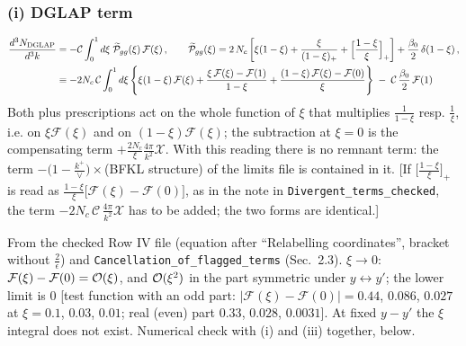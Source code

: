 \documentclass[9pt]{article}
\numberwithin{equation}{section}
\begin{document}
\subsubsection{(i) DGLAP term}
\begin{align}
\frac{d^{3}N_{\rm DGLAP}}{d^{3}k} & =-\mathcal{C}\int_{0}^{1}d\xi\;\widetilde{\mathcal P}_{gg}(\xi)\,\mathcal{F}(\xi)\,,\qquad
\widetilde{\mathcal{P}}_{gg}(\xi) = 2\,N_{c}\left[\xi(1-\xi) + \frac{\xi}{(1-\xi)_{+}} + \Big[\frac{1-\xi}{\xi}\Big]_{+}\right]+\frac{\beta_{0}}{2}\,\delta(1-\xi)\,,\notag\\
& \equiv-2N_{c}\,\mathcal{C}\int_{0}^{1}d\xi\,\Bigg\{\xi(1-\xi)\,\mathcal{F}(\xi)+\frac{\xi\,\mathcal{F}(\xi)-\mathcal{F}(1)}{1-\xi}+\frac{(1-\xi)\,\mathcal{F}(\xi)-\mathcal{F}(0)}{\xi}\Bigg\}\;-\;\mathcal{C}\,\frac{\beta_{0}}{2}\,\mathcal{F}(1)
\end{align}
Both plus prescriptions act on the whole function of $\xi$ that multiplies $\frac{1}{1-\xi}$ resp. $\frac{1}{\xi}$, i.e. on $\xi\mathcal{F}(\xi)$ and on $(1-\xi)\mathcal{F}(\xi)$; the subtraction at $\xi=0$ is the compensating term $+\frac{2N_{c}}{\xi}\frac{4\pi}{k^{2}}\mathcal{X}$. With this reading there is no remnant term: the term $-\big(1-\frac{k^{+}}{\vee}\big)\times$(BFKL structure) of the limits file is contained in it. [If $\big[\frac{1-\xi}{\xi}\big]_{+}$ is read as $\frac{1-\xi}{\xi}\big[\mathcal{F}(\xi)-\mathcal{F}(0)\big]$, as in the note in \texttt{Divergent\_terms\_checked}, the term $-2N_{c}\,\mathcal{C}\,\frac{4\pi}{k^{2}}\mathcal{X}$ has to be added; the two forms are identical.]\par
{\color{gray}\small From the checked Row IV file (equation after ``Relabelling coordinates'', bracket without $\frac{2}{\epsilon}$) and \texttt{Cancellation\_of\_flagged\_terms} (Sec.~2.3). $\xi\to0$: $\mathcal{F}(\xi)-\mathcal{F}(0)={\cal O}(\xi)$, and ${\cal O}(\xi^{2})$ in the part symmetric under $y\leftrightarrow y'$; the lower limit is $0$ [test function with an odd part: $|\mathcal{F}(\xi)-\mathcal{F}(0)|=0.44$, $0.086$, $0.027$ at $\xi=0.1$, $0.03$, $0.01$; real (even) part $0.33$, $0.028$, $0.0031$]. At fixed $y-y'$ the $\xi$ integral does not exist. Numerical check with (i) and (iii) together, below.}
\end{document}
